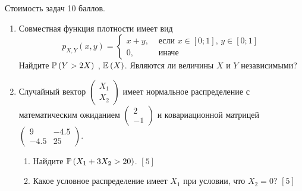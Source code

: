 \documentclass[12pt, a4paper]{article}\usepackage[]{graphicx}\usepackage[]{color}
\begin{document}
Стоимость задач 10 баллов.


\begin{enumerate}
\item Совместная функция плотности имеет вид
\[
p_{X,Y} \left(x,y\right)=
\begin{cases}
x+y, & \text{ если } x\in \left[0;1\right],\, y\in \left[0;1\right] \\
0, & \text{ иначе}
\end{cases}
\]
Найдите  $\P\left(Y>2X\right)$ ,  $\E\left(X\right)$.
Являются ли величины $X$ и $Y$ независимыми?
\item Случайный вектор  $\left(\begin{array}{c}
{X_{1} } \\ {X_{2} }
\end{array}\right)$  имеет нормальное распределение с
математическим ожиданием  $\left(\begin{array}{c} {2} \\ {-1}
\end{array}\right)$  и ковариационной матрицей
$\left(\begin{array}{cc} {9} & {-4.5} \\ {-4.5} & {25}
\end{array}\right)$.
\begin{enumerate}
\item Найдите  $\P\left(X_{1} +3X_{2} >20\right)$. $[5]$
\item Какое условное распределение имеет $X_{1}$ при условии, что $X_{2}=0$? $[5]$
\end{enumerate}


\end{enumerate}
\end{document}
